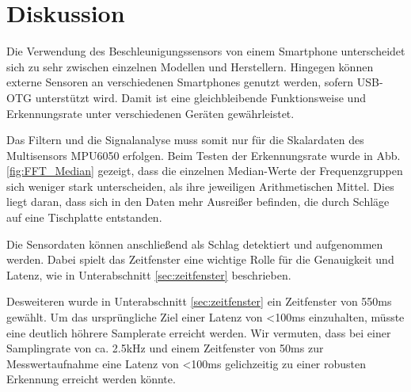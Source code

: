 \section{Diskussion}
Die Verwendung des Beschleunigungssensors von einem Smartphone unterscheidet sich zu sehr zwischen einzelnen Modellen und Herstellern.
Hingegen können externe Sensoren an verschiedenen Smartphones genutzt werden, sofern USB-OTG unterstützt wird.
Damit ist eine gleichbleibende Funktionsweise und Erkennungsrate unter verschiedenen Geräten gewährleistet.

Das Filtern und die Signalanalyse muss somit nur für die Skalardaten des Multisensors MPU6050 erfolgen.
Beim Testen der Erkennungsrate wurde in Abb. \ref{fig:FFT_Median} gezeigt, dass die einzelnen Median-Werte der Frequenzgruppen sich weniger stark unterscheiden, als ihre jeweiligen Arithmetischen Mittel.
Dies liegt daran, dass sich in den Daten mehr Ausreißer befinden, die durch Schläge auf eine Tischplatte entstanden.

Die Sensordaten können anschließend als Schlag detektiert und aufgenommen werden.
Dabei spielt das Zeitfenster eine wichtige Rolle für die Genauigkeit und Latenz, wie in Unterabschnitt \ref{sec:zeitfenster} beschrieben.

Desweiteren wurde in Unterabschnitt \ref{sec:zeitfenster} ein Zeitfenster von 550ms gewählt.
Um das ursprüngliche Ziel einer Latenz von <100ms einzuhalten, müsste eine deutlich höhrere Samplerate erreicht werden. Wir vermuten, dass bei einer Samplingrate von ca. 2.5kHz und einem Zeitfenster von 50ms zur Messwertaufnahme eine Latenz von <100ms gelichzeitig zu einer robusten Erkennung erreicht werden könnte.
